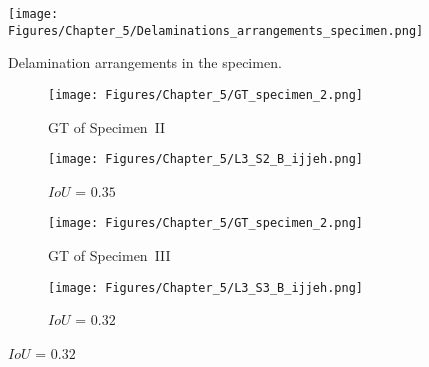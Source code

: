 \begin{figure} [h!]
	\centering
	\texttt{[image: Figures/Chapter\_5/Delaminations\_arrangements\_specimen.png]}
	\caption{Delamination arrangements in the specimen.}
	\label{fig:Delaminations_arrangements_specimen}
\end{figure}
\begin{figure} [!h]
	\centering
	\begin{subfigure}[b]{0.47\textwidth}
		\centering
		\texttt{[image: Figures/Chapter\_5/GT\_specimen\_2.png]}
		\caption{GT of Specimen~II}
		\label{fig:GT_specimen_2}
	\end{subfigure}
	\hfill
	\begin{subfigure}[b]{0.47\textwidth}
		\centering
		\texttt{[image: Figures/Chapter\_5/L3\_S2\_B\_ijjeh.png]}
		\caption{\(IoU\) = \(0.35\)} 
		\label{fig:L3_S2_B_ijjeh}
	\end{subfigure}
	\par\medskip
	\begin{subfigure}[b]{0.47\textwidth}
		\centering
		\texttt{[image: Figures/Chapter\_5/GT\_specimen\_2.png]}
		\caption{GT of Specimen~III}
		\label{fig:gt_specimen_3}
	\end{subfigure}
	\hfill
	\begin{subfigure}[b]{0.47\textwidth}
		\centering
		\texttt{[image: Figures/Chapter\_5/L3\_S3\_B\_ijjeh.png]}
		\caption{\(IoU\) = \(0.32\)} 
		\label{fig:L3_S3_B_ijjeh}
	\end{subfigure}
	\par\medskip

\end{figure}
